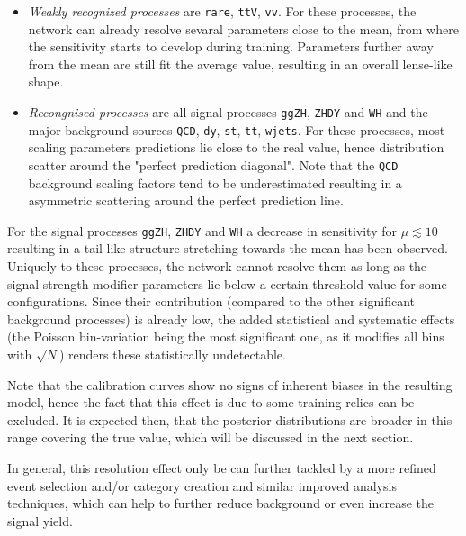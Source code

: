 \begin{itemize}
	\item[] \textit{Weakly recognized processes} are \texttt{rare}, \texttt{ttV}, \texttt{vv}. For these processes, the network can already resolve sevaral parameters close to the mean, from where the sensitivity starts to develop during training. Parameters further away from the mean are still fit the average value, resulting in an overall lense-like shape.
	\item[] \textit{Recongnised processes} are all signal processes \texttt{ggZH}, \texttt{ZHDY} and \texttt{WH} and the major background sources \texttt{QCD}, \texttt{dy}, \texttt{st}, \texttt{tt}, \texttt{wjets}. For these processes, most scaling parameters predictions lie close to the real value, hence distribution scatter around the "perfect prediction diagonal". Note that the \texttt{QCD} background scaling factors tend to be underestimated resulting in a asymmetric scattering around the perfect prediction line.
\end{itemize}

For the signal processes \texttt{ggZH}, \texttt{ZHDY} and \texttt{WH} a decrease in sensitivity for $\mu\lesssim10$ resulting in a tail-like structure stretching towards the mean has been observed. Uniquely to these processes, the network cannot resolve them as long as the signal strength modifier parameters lie below a certain threshold value for some configurations. Since their contribution (compared to the other significant background processes) is already low, the added statistical and systematic effects (the Poisson bin-variation being the most significant one, as it modifies all bins with $\sqrt{N}$) renders these statistically undetectable.

Note that the calibration curves show no signs of inherent biases in the resulting model, hence the fact that this effect is due to some training relics can be excluded. It is expected then, that the posterior distributions are broader in this range covering the true value, which will be discussed in the next section.

In general, this resolution effect only be can further tackled by a more refined event selection and/or category creation and similar improved analysis techniques, which can help to further reduce background or even increase the signal yield.

